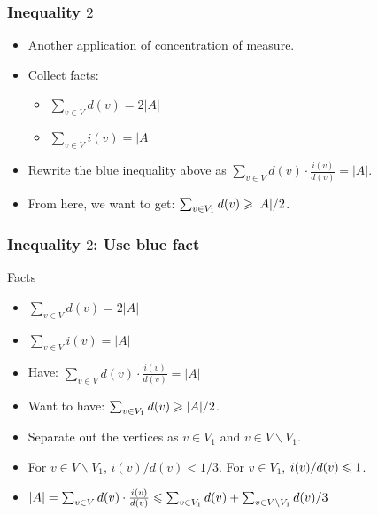 \documentclass{beamer}
\begin{document}
\begin{frame}
\frametitle{Inequality $2$}
\begin{itemize}
\item Another application of concentration of measure.
\item Collect facts:
\begin{itemize}
\item {\color{red} $\sum_{v\in V} d(v) = 2|A|$}
\item {\color{blue} $\sum_{v \in V} i(v) = |A|$}
\end{itemize}
\item Rewrite the {\color{blue} blue} inequality above as {\color{blue} $\sum_{v \in V} d(v)\cdot\frac{i(v)}{d(v)} = |A|$}. 
\item From here, we want to get: $\sum_{v\in V_1} d(v) \geqslant |A|/2$.
\end{itemize}
\end{frame}

\begin{frame}
\frametitle{Inequality $2$: Use {\color{blue} blue} fact}
\begin{block}{Facts}
\begin{itemize}
\item {\color{red} $\sum_{v\in V} d(v) = 2|A|$}
\item {\color{blue} $\sum_{v \in V} i(v) = |A|$}
\end{itemize}
\end{block}
\begin{itemize}
\item Have: {\color{blue} $\sum_{v \in V} d(v)\cdot\frac{i(v)}{d(v)} 
= |A|$}
\item Want to have: $\sum_{v\in V_1} d(v) \geqslant |A|/2$.
\item Separate out the vertices as $v\in V_1$ and $v\in V\backslash V_1$. 
\item For $v \in V \backslash V_1$, $i(v)/d(v) < 1/3$. For $v \in V_1$, $i(v)/d(v) \leqslant 1$. 
\item {\color{blue} $|A| = \sum_{v \in V} d(v)\cdot\frac{i(v)}{d(v)} \leqslant \sum_{v \in V_1} d(v) + \sum_{v\in V\backslash V_1} d(v)/3$}
\end{itemize}
\end{frame}
\end{document}
